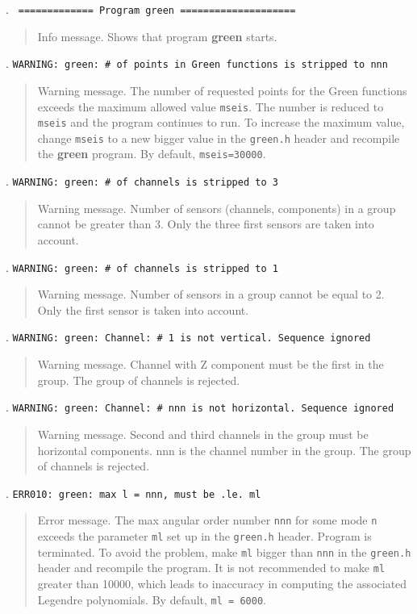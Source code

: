 . \texttt{ ============= Program green ====================}
\begin{quote}
Info message. Shows that program {\bf green} starts.
\end{quote}
. \texttt{WARNING: green: \# of points in Green functions is stripped to nnn}
\begin{quote}
Warning message. The number of requested points for the Green functions
exceeds the maximum allowed value {\tt mseis}. The number is reduced to {\tt mseis}
and the program continues to run. To increase the maximum value, change  {\tt mseis} to
a new bigger value in the {\tt green.h} header and recompile the {\bf green} program.
By default, {\tt mseis=30000}.
\end{quote}
. \texttt{WARNING: green: \# of channels is stripped to 3}
\begin{quote}
Warning message. Number of sensors (channels, components) in a group cannot 
be greater than 3.
Only the three first sensors are taken into account. 
\end{quote}
. \texttt{WARNING: green: \# of channels is stripped to 1}
\begin{quote}
Warning message. Number of sensors in a group cannot be equal to 2.
Only the first sensor is taken into account. 
\end{quote}
. \texttt{WARNING: green: Channel: \# 1 is not vertical. Sequence ignored}
\begin{quote}
Warning message. Channel with Z component must be the first in the group.
The group of channels is rejected.
\end{quote}
. \texttt{WARNING: green: Channel: \# nnn is not horizontal. Sequence ignored}
\begin{quote}
Warning message. Second and third channels in the group must be horizontal
components. nnn is the channel number in the group. The group of channels is rejected.
\end{quote}
. \texttt{ERR010: green: max l = nnn, must be .le. ml}
\begin{quote}
Error message. The max angular order number {\tt nnn} for some mode {\tt n}
exceeds the parameter {\tt ml} set up in the {\tt green.h} header.
Program is terminated.
To avoid the problem, make {\tt ml} bigger than {\tt nnn} in the {\tt green.h} header
and recompile the program. It is not recommended to make {\tt ml} greater than
10000, which leads to inaccuracy in computing the associated Legendre polynomials.
By default, {\tt ml = 6000}.
\end{quote}
